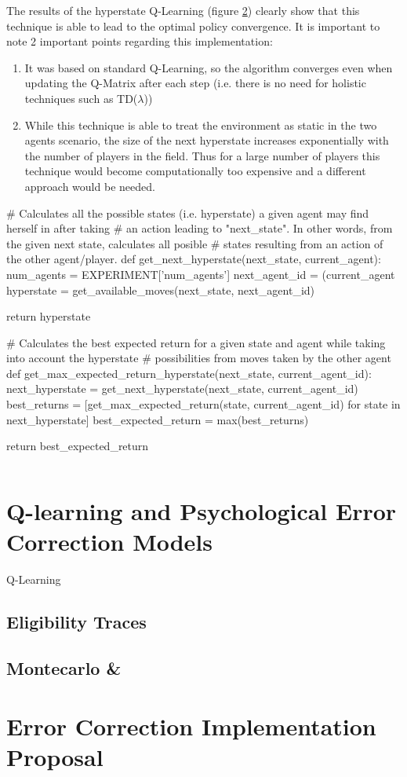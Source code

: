 \documentclass[10pt]{article}
\begin{document}
    The results of the hyperstate Q-Learning (figure \ref{}) clearly show that this technique is able to lead to the optimal policy convergence. It is important to note 2 important points regarding this implementation:
    \begin{enumerate}[1)]
        \item It was based on standard Q-Learning, so the algorithm converges even when updating the Q-Matrix after each step (i.e. there is no need for holistic techniques such as TD($\lambda$))
        \item While this technique is able to treat the environment as static in the two agents scenario, the size of the next hyperstate increases exponentially with the number of players in the field. Thus for a large number of players this technique would become computationally too expensive and a different approach would be needed.
    \end{enumerate}

    \begin{python}[t]
# Calculates all the possible states (i.e. hyperstate) a given agent may find herself in after taking
# an action leading to "next_state". In other words, from the given next state, calculates all posible
# states resulting from an action of the other agent/player.
def get_next_hyperstate(next_state, current_agent):
    num_agents = EXPERIMENT['num_agents']
    next_agent_id = (current_agent %
    hyperstate = get_available_moves(next_state, next_agent_id)

    return hyperstate

# Calculates the best expected return for a given state and agent while taking into account the hyperstate
# possibilities from moves taken by the other agent
def get_max_expected_return_hyperstate(next_state, current_agent_id):
    next_hyperstate = get_next_hyperstate(next_state, current_agent_id)
    best_returns = [get_max_expected_return(state, current_agent_id) for state in next_hyperstate]
    best_expected_return = max(best_returns)

    return best_expected_return
    \end{python}
    \begin{lstlisting}[caption=Implementation code for Hyperstate - Best expected return calculation, label=lst:hyperstate]
    \end{lstlisting}

\section{Q-learning and Psychological Error Correction Models}

Q-Learning

\subsection{Eligibility Traces}
\subsection{Montecarlo & }

\section{Error Correction Implementation Proposal}
\end{document}
